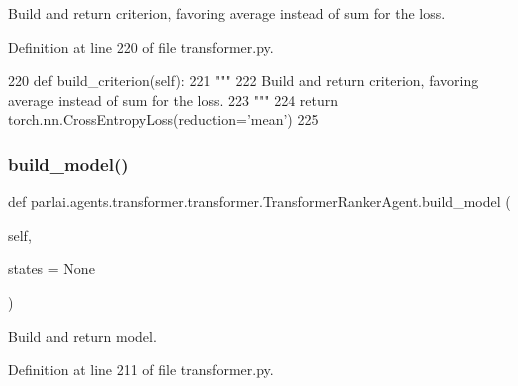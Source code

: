 \begin{DoxyVerb}Build and return criterion, favoring average instead of sum for the loss.
\end{DoxyVerb}
 

Definition at line 220 of file transformer.\+py.


\begin{DoxyCode}
220     \textcolor{keyword}{def }build\_criterion(self):
221         \textcolor{stringliteral}{"""}
222 \textcolor{stringliteral}{        Build and return criterion, favoring average instead of sum for the loss.}
223 \textcolor{stringliteral}{        """}
224         \textcolor{keywordflow}{return} torch.nn.CrossEntropyLoss(reduction=\textcolor{stringliteral}{'mean'})
225 
\end{DoxyCode}
\mbox{\label{classparlai_1_1agents_1_1transformer_1_1transformer_1_1TransformerRankerAgent_a3336fdab2d667e6e631135ec70e8558f}} 
\subsubsection{\texorpdfstring{build\+\_\+model()}{build\_model()}}
{\footnotesize\ttfamily def parlai.\+agents.\+transformer.\+transformer.\+Transformer\+Ranker\+Agent.\+build\+\_\+model (\begin{DoxyParamCaption}\item[{}]{self,  }\item[{}]{states = {\ttfamily None} }\end{DoxyParamCaption})}

\begin{DoxyVerb}Build and return model.
\end{DoxyVerb}
 

Definition at line 211 of file transformer.\+py.


